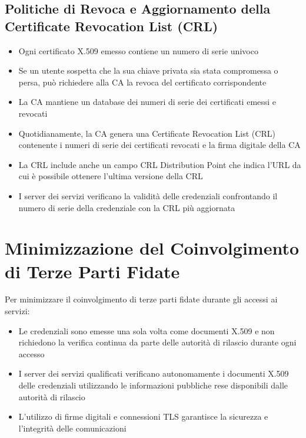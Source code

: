     
        \subsection{Politiche di Revoca e Aggiornamento della Certificate Revocation List (CRL)}
            \begin{itemize}
                \item Ogni certificato X.509 emesso contiene un numero di serie univoco
    
                \item Se un utente sospetta che la sua chiave privata sia stata compromessa o persa, può richiedere alla CA la revoca del certificato corrispondente
    
                \item La CA mantiene un database dei numeri di serie dei certificati emessi e revocati
    
                \item Quotidianamente, la CA genera una Certificate Revocation List (CRL) contenente i numeri di serie dei certificati revocati e la firma digitale della CA
    
                \item La CRL include anche un campo CRL Distribution Point che indica l'URL da cui è possibile ottenere l'ultima versione della CRL
    
                \item I server dei servizi verificano la validità delle credenziali confrontando il numero di serie della credenziale con la CRL più aggiornata
            \end{itemize}
    
    
    \section{Minimizzazione del Coinvolgimento di Terze Parti Fidate}
        Per minimizzare il coinvolgimento di terze parti fidate durante gli accessi ai servizi:
        
        \begin{itemize}
            \item Le credenziali sono emesse una sola volta come documenti X.509 e non richiedono la verifica continua da parte delle autorità di rilascio durante ogni accesso
            
            \item I server dei servizi qualificati verificano autonomamente i documenti X.509 delle credenziali utilizzando le informazioni pubbliche rese disponibili dalle autorità di rilascio
            
            \item L'utilizzo di firme digitali e connessioni TLS garantisce la sicurezza e l'integrità delle comunicazioni
        \end{itemize}
    

